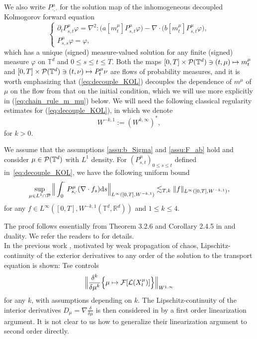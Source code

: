 We also write $P_{\cdot,\cdot}^{\mu}$ for the solution map of the inhomogeneous decoupled Kolmogorov forward equation 
\begin{equation}\label{eq:decouple_KOL}
\begin{cases}
\partial_t P_{s,t}^{\mu}\varphi = \nabla^2 : \big(a[m^{\mu}_t]P_{s,t}^{\mu}\varphi \big) - \nabla \cdot \big( b[m^{\mu}_t] P_{s,t}^{\mu}\varphi \big),\\
P_{s,s}^{\mu}\varphi = \varphi,
\end{cases}
\end{equation}
which has a unique (signed) measure-valued solution for any finite (signed) measure $\varphi$ on $\mathbb{T}^d$ and $0 \leq s \leq t \leq T$. Both the maps $[0,T] \times \mathcal{P}(\mathbb{T}^d) \ni (t,\mu) \mapsto m_t^{\mu}$ and $[0,T] \times \mathcal{P}(\mathbb{T}^d) \ni (t,\nu) \mapsto P_{t}^{\mu}\nu$ are flows of probability measures, and it is worth emphasizing that (\ref{eq:decouple_KOL}) decouples the dependence of $m^{\mu}$ of $\mu$ on the flow from that on the initial condition, which we will use more explicitly in (\ref{eq:chain_rule_m_mu}) below. We will need the following classical regularity estimates for (\ref{eq:decouple_KOL}), in which we denote
\begin{equation}\label{eq:def-W-1space}
    W^{-k,1} :=(W^{k,\infty})^{\ast},
\end{equation}
for $k>0$.  

\begin{lem}\label{lem:heat-kernel}
We assume that the assumptions \ref{assu:b_Sigma} and \ref{assu:F_ab} hold and consider $\mu \in \mathcal{P}(\mathbb{T}^d)$ with $L^1$ density. For $(P^{\mu}_{s,t})_{0\leq s\leq t}$ defined in~\eqref{eq:decouple_KOL}, we have the following uniform bound
\begin{equation}\label{eq:reg_P^mu_st}
\sup_{\mu \in L^1 \cap \mathcal{P}} \Big\|\int_0^{\cdot} P^{\mu}_{s,\cdot} (\nabla \cdot f_s)\mathrm{d}s\Big\|_{L^{\infty}([0,T], W^{-k,1})} \lesssim_{T,k}  \|f\|_{L^{\infty}([0,T], W^{-k,1})},
\end{equation}
for any $f \in L^{\infty}([0,T], W^{-k,1}(\mathbb{T}^d,\mathbb{R}^d))$ and $1 \leq k \leq 4$. 
\end{lem}

The proof follows essentially from Theorem 3.2.6 and Corollary 2.4.5 in \cite{S08} and duality. We refer the readers to \cite[Lemma 4.3]{djurdjevac2025weak} for details.\\

In the previous work \cite{T21}, motivated by weak propagation of chaos, Lipschitz-continuity of the exterior derivatives to any order of the solution to the transport equation is shown: Tse controls
\[
   \Big\|\frac{\delta^k}{\delta \mu^k}\Big\{\mu \mapsto \mathcal{F}[\mathcal{L}(X^{\mu}_{t})] \Big\}\Big\|_{W^{1,\infty}}
\]
for any $k$, with assumptions depending on $k$. The Lipschitz-continuity of the interior derivatives $D_\mu = \nabla \frac{\delta}{\delta\mu}$ is then considered in \cite{DT21} by a first order linearization argument. It is not clear to us how to generalize their linearization argument to second order directly.\\

